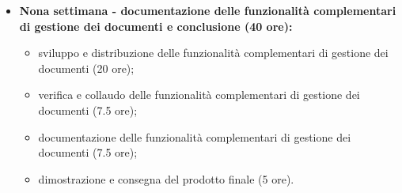 {\begin{itemize}
\begin{itemize}
            \item realizzazione delle funzionalità complementari di gestione dei documenti (20 ore).
        \end{itemize}
        \item \textbf{Nona settimana - documentazione delle funzionalità complementari di gestione dei documenti e conclusione (40 ore):} 
        \begin{itemize}
            \item sviluppo e distribuzione delle funzionalità complementari di gestione dei documenti (20 ore);
            \item verifica e collaudo delle funzionalità complementari di gestione dei documenti (7.5 ore);
            \item documentazione delle funzionalità complementari di gestione dei documenti (7.5 ore);
            \item dimostrazione e consegna del prodotto finale (5 ore).
        \end{itemize}
    \end{itemize}
}

\newcommand{\totaleOre}{320}

\newcommand{\obiettiviObbligatori}{
    \item \underline{\textit{O01}}: formazione sui domini coinvolti nel progetto;
	 \item \underline{\textit{O02}}: progettazione e realizzazione del protocollo Smart Contract;
	 \item \underline{\textit{O03}}: progettazione e realizzazione della dApp di notarizzazione;
	 \item \underline{\textit{O04}}: progettazione e realizzazione dell'interfaccia di monitoraggio;
}

\newcommand{\obiettiviDesiderabili}{
	 \item \underline{\textit{D01}}: documentazione del protocollo Smart Contract;
	 \item \underline{\textit{D02}}: documentazione della dApp di notarizzazione;
	 \item \underline{\textit{D03}}: documentazione dell'interfaccia di monitoraggio;
}

\newcommand{\obiettiviFacoltativi}{
	 \item \underline{\textit{F01}}: progettazione e realizzazione delle funzionalità complementari di gestione dei documenti;
	 \item \underline{\textit{F02}}: documentazione delle funzionalità complementari di gestione dei documenti;
}